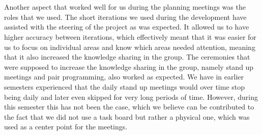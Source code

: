 \\\\
Another aspect that worked well for us during the planning meetings was the roles that we used. 
The short iterations we used during the development have assisted with the steering of the project as was expected. It allowed us to have higher accuracy between iterations, which effectively meant that it was easier for us to focus on individual areas and know which areas needed attention, meaning that it also increased the knowledge sharing in the group. The  ceremonies that were supposed to increase the knowledge sharing in the group, namely stand up meetings and pair programming, also worked as expected. We have in earlier semesters experienced that the daily stand up meetings would over time stop being daily and later even skipped for very long periods of time. However, during this semester this has not been the case, which we believe can be contributed to the fact that we did not use a task board but rather a physical one, which was used as a center point for the meetings. 
\\\\









